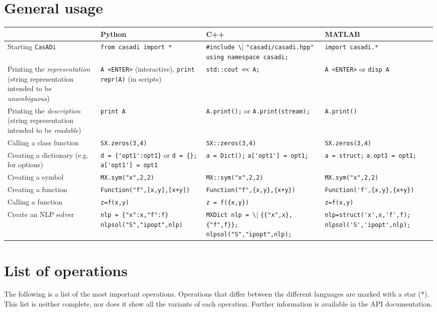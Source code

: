 \documentclass[a4paper,12pt]{book}
\newcommand{\CasADi}{\texttt{CasADi}\xspace}
\begin{document}
\section{General usage}
\begin{center}
  \scriptsize
  \begin{tabular}{| p{3.5cm} | p{3.5cm} | p{3.5cm} | p{3.5cm} | }
    \hline
      & Python & C++ & MATLAB \\ \hline
    Starting \CasADi & \verb|from casadi import *| & \verb|#include \| \verb|"casadi/casadi.hpp"| \verb|using namespace casadi;| & \verb|import casadi.*| \\ \hline
    Printing the \emph{representation} (string representation intended to be \emph{unambiguous}) & \verb|A <ENTER>| (interactive), \verb|print repr(A)| (in scripts) & \verb|std::cout << A;|& \verb|A <ENTER>| or \verb|disp A|\\ \hline
    Printing the \emph{description} (string representation intended to be \emph{readable}) & \verb|print A| & \verb|A.print();| or \verb|A.print(stream);|& \verb|A.print()| \\ \hline
    Calling a class function & \verb|SX.zeros(3,4)| & \verb|SX::zeros(3,4)| & \verb|SX.zeros(3,4)|\\ \hline
    Creating a dictionary (e.g. for options) & \verb|d = {'opt1':opt1}| or \verb|d = {}; a['opt1'] = opt1| & \verb|a = Dict();| \verb|a['opt1'] = opt1;| & \verb|a = struct;| \verb|a.opt1 = opt1;| \\ \hline
    Creating a symbol & \verb|MX.sym("x",2,2)| & \verb|MX::sym("x",2,2)| & \verb|MX.sym("x",2,2)|\\ \hline
    Creating a function & \verb|Function("f",[x,y],[x+y])| & \verb|Function("f",{x,y},{x+y})| & \verb|Function('f',{x,y},{x+y})| \\ \hline
    Calling a function & \verb|z=f(x,y)| & \verb|z = f({x,y})| & \verb|z=f(x,y)| \\ \hline
    Create an NLP solver & \verb|nlp = {"x":x,"f":f}| \verb|nlpsol("S","ipopt",nlp)| & \verb|MXDict nlp = \|    \verb|{{"x",x},{"f",f}};|  \verb|nlpsol("S","ipopt",nlp);| & \verb|nlp=struct('x',x,'f',f);| \verb|nlpsol('S','ipopt',nlp);| \\ \hline
  \end{tabular}
\end{center}

\section{List of operations}
The following is a list of the most important operations. Operations that differ between the different
languages are marked with a star (*). This list is neither complete, nor does it show all the variants of
each operation. Further information is available in the API documentation.
\end{document}
